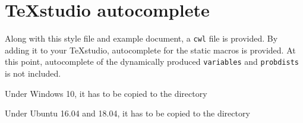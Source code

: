 \documentclass
[
]
{article}
\begin{document}
\section{\TeX studio autocomplete}
Along with this style file and example document, a \texttt{cwl} file is provided. By adding it to your \TeX studio, autocomplete for the static macros is provided. At this point, autocomplete of the dynamically produced \texttt{variables} and \texttt{probdists} is not included.

Under Windows 10, it has to be copied to the directory  

Under Ubuntu 16.04 and 18.04, it has to be copied to the directory  

\printbibliography
\end{document}
